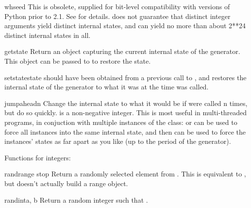 \begin{funcdesc}{whseed}{}
  This is obsolete, supplied for bit-level compatibility with versions
  of Python prior to 2.1.
  See  for details.   does not guarantee
  that distinct integer arguments yield distinct internal states, and can
  yield no more than about 2**24 distinct internal states in all.
\end{funcdesc}

\begin{funcdesc}{getstate}{}
  Return an object capturing the current internal state of the generator.
  This object can be passed to  to restore the state.
\end{funcdesc}

\begin{funcdesc}{setstate}{state}
   should have been obtained from a previous call to
  , and  restores the internal state
  of the generator to what it was at the time  was called.
 \end{funcdesc}

\begin{funcdesc}{jumpahead}{n}
  Change the internal state to what it would be if  were
  called n times, but do so quickly.   is a non-negative integer.
  This is most useful in multi-threaded programs, in conjuction with
  multiple instances of the  class:   or
   can be used to force all instances into the same
  internal state, and then  can be used to force the
  instances' states as far apart as you like (up to the period of the
  generator).
 \end{funcdesc}

Functions for integers:

\begin{funcdesc}{randrange}{ stop}
  Return a randomly selected element from .  This is equivalent to
  ,
  but doesn't actually build a range object.
\end{funcdesc}

\begin{funcdesc}{randint}{a, b}
  Return a random integer  such that
  .
\end{funcdesc}


